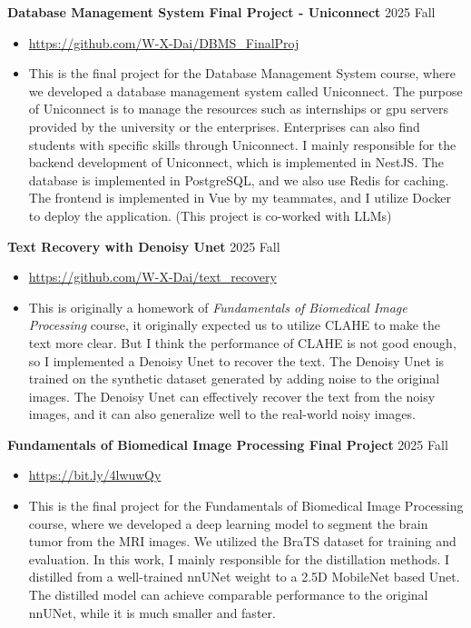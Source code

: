 \documentclass[11pt]{article}
\begin{document}
\textbf{Database Management System Final Project - Uniconnect} \hfill 2025 Fall
\begin{itemize}
    \item \href{https://github.com/W-X-Dai/DBMS_FinalProj}{https://github.com/W-X-Dai/DBMS\_FinalProj}
    \item This is the final project for the Database Management System course, where we developed a database management system called Uniconnect. The purpose of Uniconnect is to manage the resources such as internships or gpu servers provided by the university or the enterprises. Enterprises can also find students with specific skills through Uniconnect. I mainly responsible for the backend development of Uniconnect, which is implemented in NestJS. The database is implemented in PostgreSQL, and we also use Redis for caching. The frontend is implemented in Vue by my teammates, and I utilize Docker to deploy the application. (This project is co-worked with LLMs)
\end{itemize}
\textbf{Text Recovery with Denoisy Unet} \hfill 2025 Fall
\begin{itemize}
    \item \href{https://github.com/W-X-Dai/text_recovery}{https://github.com/W-X-Dai/text\_recovery}
    \item This is originally a homework of \textit{Fundamentals of Biomedical Image Processing} course, it originally expected us to utilize CLAHE to make the text more clear. But I think the performance of CLAHE is not good enough, so I implemented a Denoisy Unet to recover the text. The Denoisy Unet is trained on the synthetic dataset generated by adding noise to the original images. The Denoisy Unet can effectively recover the text from the noisy images, and it can also generalize well to the real-world noisy images.
\end{itemize}
\textbf{Fundamentals of Biomedical Image Processing Final Project} \hfill 2025 Fall
\begin{itemize}
    \item \href{https://bit.ly/4lwuwQy}{https://bit.ly/4lwuwQy}
    \item This is the final project for the Fundamentals of Biomedical Image Processing course, where we developed a deep learning model to segment the brain tumor from the MRI images. We utilized the BraTS dataset for training and evaluation. In this work, I mainly responsible for the distillation methods. I distilled from a well-trained nnUNet weight to a 2.5D MobileNet based Unet. The distilled model can achieve comparable performance to the original nnUNet, while it is much smaller and faster. 
\end{itemize}
\end{document}

